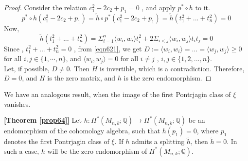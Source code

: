 \documentclass[a4paper,leqno,12pt]{amsart}
\theoremstyle{plain}
\theoremstyle{definition}
\theoremstyle{remark}
\newcommand{\Q}{\mathbb{Q}}
\begin{document}
{\begin{proof}
\noindent
Consider the relation $c_{1}^{2}-2c_{2}+p_{1}=0$ ,  and apply   $p^{*} \circ h$ to it. 
\begin{equation}
p^{*}\circ h(c_{1}^{2}-2c_{2}+p_{1})= \widetilde{h}\circ p^{*}(c_{1}^{2}-2c_{2}+p_{1}) = \widetilde{h}(t_{1}^{2}+...+t_{n}^{2})=0  
\nonumber
\end{equation}
Now,  
\begin{equation}
 \widetilde{h}(t_{1}^{2}+...+t_{n}^{2})= \Sigma_{i=1}^{n}\langle w_{i}, w_{i}\rangle t_{i}^{2}+ 2 \Sigma_{i<j} \langle w_{i}, w_{j}\rangle t_{i}t_{j}=0 
 \label{eqn621}
\end{equation}
Since , $t_{1}^{2}+...+t_{n}^{2}=0$ ,  from \ref{eqn621},  we get
$ D :=  \langle w_{i}, w_{i} \rangle =...= \langle w_{j},w_{j} \rangle  \geq 0$
for all $i,  j \in \{1,  \cdots ,  n \}$,  and  
$\langle w_{i}, w_{j} \rangle = 0$
for all $i\neq j$ ,  $i,  j \in \{ 1,2,...,n\}$. \\
 \noindent 
 Let,  if possible,  $D \neq 0$.  Then $H$ is invertible,  which is a contradiction.  Therefore,  $D=0$,  and $H$ is the zero matrix,  and $h$ is the zero endomorphism.  
 

\end{proof}

\noindent
We have an analogous result,  when the image of the first Pontrjagin class of $\xi$ vanishes.  
 \begin{myprop}   {\bf [Theorem \ref{prop64}]}  %
 Let $h:H^{*}(M_{n,k}; \Q) \to H^{*}(M_{n,k}; \Q)$  be an endomorphism of the cohomology algebra,  such that $h(p_{1})=0$,  where $p_{1}$ denotes the first Pontrjagin class of $\xi$.  If $h$ admits a splitting $\widetilde{h}$,   then $\widetilde{h} =0$.  In such a case,  $h$ will be the zero endomorphism of $H^{*}(M_{n,k};\Q)$.\\
\end{myprop}

}
\end{document}
